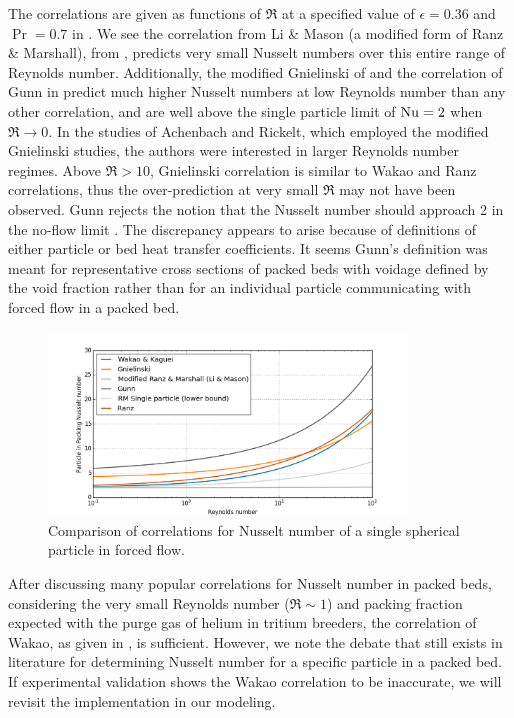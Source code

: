 The correlations are given as functions of $\Re$ at a specified value of $\epsilon = 0.36$ and $\Pr = 0.7$ in . We see the correlation from Li \& Mason (a modified form of Ranz \& Marshall), from , predicts very small Nusselt numbers over this entire range of Reynolds number. Additionally, the modified Gnielinski of  and the correlation of Gunn in  predict much higher Nusselt numbers at low Reynolds number than any other correlation, and are well above the single particle limit of $\mathrm{Nu} = 2$ when $\Re \rightarrow 0$. In the studies of Achenbach and Rickelt, which employed the modified Gnielinski studies, the authors were interested in larger Reynolds number regimes. Above $\Re > 10$, Gnielinski correlation is similar to Wakao and Ranz correlations, thus the over-prediction at very small $\Re$ may not have been observed. Gunn rejects the notion that the Nusselt number should approach 2 in the no-flow limit \cite{Gunn1978}. The discrepancy appears to arise because of definitions of either particle or bed heat transfer coefficients. It seems Gunn's definition was meant for representative cross sections of packed beds with voidage defined by the void fraction rather than for an individual particle communicating with forced flow in a packed bed. 

\begin{figure}[ht]
    \centering
    \includegraphics[width=0.85\textwidth]{figures/Nusselt-packing}
    \caption{Comparison of correlations for Nusselt number of a single spherical particle in forced flow.}
    \label{fig:Nu-packed}
\end{figure}

After discussing many popular correlations for Nusselt number in packed beds, considering the very small Reynolds number ($\Re \sim 1$) and packing fraction expected with the purge gas of helium in tritium breeders, the correlation of Wakao\etal, as given in , is sufficient. However, we note the debate that still exists in literature for determining Nusselt number for a specific particle in a packed bed. If experimental validation shows the Wakao correlation to be inaccurate, we will revisit the implementation in our modeling.

